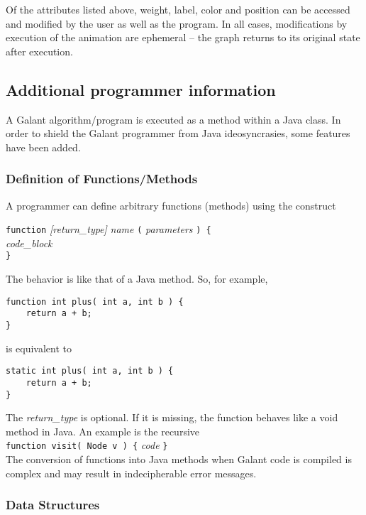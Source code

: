 Of the attributes listed above, weight, label, color and position can be
accessed and modified by the user as well as the program.
In all cases, modifications by execution of the animation are ephemeral
-- the graph returns to its original state after execution.

\subsection{Additional programmer information}

A Galant algorithm/program is executed as a method within a Java class.
In order to shield the Galant programmer from Java ideosyncrasies,
some features have been added.

\subsubsection*{Definition of Functions/Methods}

A programmer can define arbitrary functions (methods) using the construct

\texttt{function} \textsl{[return\_type]} \textsl{name} \texttt{(}
 \textsl{parameters} \texttt{) \{} \\
 \hspace*{3em} \textsl{code\_block} \\
 \texttt{\}}

The behavior is like that of a Java method. So, for example,
\begin{verbatim}
function int plus( int a, int b ) {
    return a + b;
}
\end{verbatim}
is equivalent to
\begin{verbatim}
static int plus( int a, int b ) {
    return a + b;
}
\end{verbatim}

The \textsl{return\_type} is optional. If it is missing, the function behaves like
a \textsf{void} method in Java. An example is the recursive
\\
\texttt{function visit( Node v ) \{} \textsl{code} \texttt{\}}
\\
The conversion of functions into Java methods when Galant code is compiled
is complex and may result in indecipherable error messages.

\subsubsection*{Data Structures}

